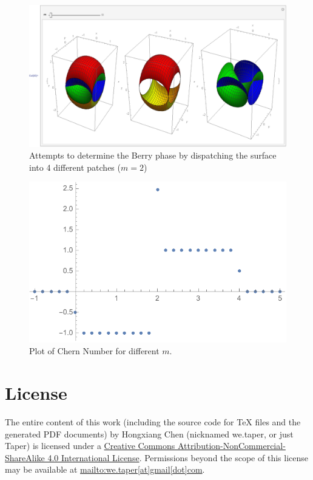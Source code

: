 \documentclass{article}
\begin{document}
    \begin{figure}[htpb]
        \centering
        \includegraphics[width=0.8\linewidth]{pics/BerryPhase/attempts.pdf}
        \caption{Attempts to determine the Berry phase by dispatching the surface
        into 4 different patches ($m=2$)}
        \label{fig:BerryPhase/attempts}
    \end{figure}
    \begin{figure}[htpb]
        \centering
        \includegraphics[width=0.8\linewidth]{pics/BerryPhase/SSQFormulaPlot.pdf}
        \caption{Plot of Chern Number for different $m$.}
        \label{fig:BerryPhase/SSQFormulaPlot}
    \end{figure}
\section{License}
The entire content of this work (including the source code
for TeX files and the generated PDF documents) by 
Hongxiang Chen (nicknamed we.taper, or just Taper) is
licensed under a 
\href{http://creativecommons.org/licenses/by-nc-sa/4.0/}{Creative 
Commons Attribution-NonCommercial-ShareAlike 4.0 International 
License}. Permissions beyond the scope of this 
license may be available at \url{mailto:we.taper[at]gmail[dot]com}.

{}

\printnomenclature
\end{document}
